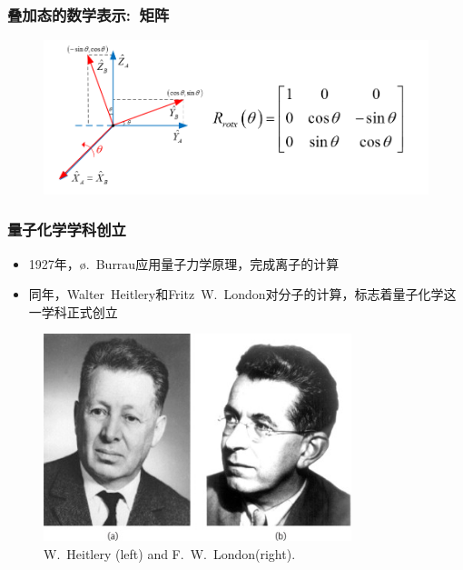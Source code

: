 \frame
{
	\frametitle{叠加态的数学表示:~矩阵}
\begin{figure}[h!]
\centering
\vspace{-1.5pt}
\hspace*{-0.12in}
\includegraphics[height=0.48\textwidth,width=1.05\textwidth]{Figures/Matrix_Rotation.png}
\label{Matrix-Rotation}
\end{figure}
}

\frame
{
	\frametitle{量子化学学科创立}
	\begin{itemize}
		\item \textrm{1927}年，\textrm{\o.~Burrau}应用量子力学原理，完成\textrm{}离子的计算
		\item 同年，\textrm{Walter~Heitlery}和\textrm{Fritz~W.~London}对\textrm{}分子的计算，标志着量子化学这一学科正式创立
	\end{itemize}
\begin{figure}[h!]
\centering
\vspace{-1.5pt}
\hspace*{-0.12in}
\includegraphics[height=0.48\textwidth,width=0.80\textwidth,viewport=0 10 260 175,clip]{Figures/Walter-Heitlery_Fritz-W-London.jpeg}
\caption{\textrm{W.~Heitlery (left) and F.~W.~London(right).}}
\label{Heitlery_London}
\end{figure}
}

